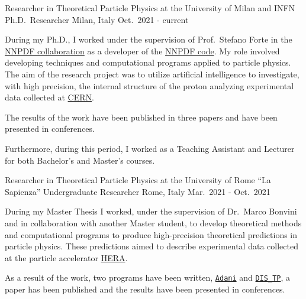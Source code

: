 

\begin{cventries}

  \cventry
  {Researcher in Theoretical Particle Physics at the University of Milan and INFN}
  {Ph.D.\ Researcher}
  {Milan, Italy}
  {Oct.\ 2021 - current}
  {
      \begin{cvitems} %
        \item During my Ph.D., I worked under the supervision of Prof.\ Stefano Forte in the \href{https://nnpdf.mi.infn.it}{NNPDF collaboration} as a developer of the \href{https://github.com/NNPDF}{NNPDF code}.
        My role involved developing techniques and computational programs applied to particle physics.
        The aim of the research project was to utilize artificial intelligence to investigate, with high precision,
        the internal structure of the proton analyzing experimental data collected at \href{https://home.cern}{CERN}.
        \item The results of the work have been published in three papers and have been presented in conferences.
        \item Furthermore, during this period, I worked as a Teaching Assistant and Lecturer for both Bachelor's and Master's courses. 
      \end{cvitems}
    }

    \cventry
{Researcher in Theoretical Particle Physics at the University of Rome ``La Sapienza''}
{Undergraduate Researcher}
{Rome, Italy}
{Mar.\ 2021 - Oct.\ 2021}
{
      \begin{cvitems} %
        \item During my Master Thesis I worked, under the supervision of Dr.\ Marco Bonvini and in collaboration with another Master student,
        to develop theoretical methods and computational programs to produce high-precision theoretical predictions in particle physics.
        These predictions aimed to describe experimental data collected at the particle accelerator \href{https://en.wikipedia.org/wiki/HERA_(particle_accelerator)}{HERA}.
        \item As a result of the work, two programs have been written, \href{https://github.com/niclaurenti/adani}{\texttt{Adani}} and \href{https://github.com/andreab1997/DIS_TP}{\texttt{DIS\_TP}},
        a paper has been published and the results have been presented in conferences.
      \end{cvitems}
    }


\end{cventries}